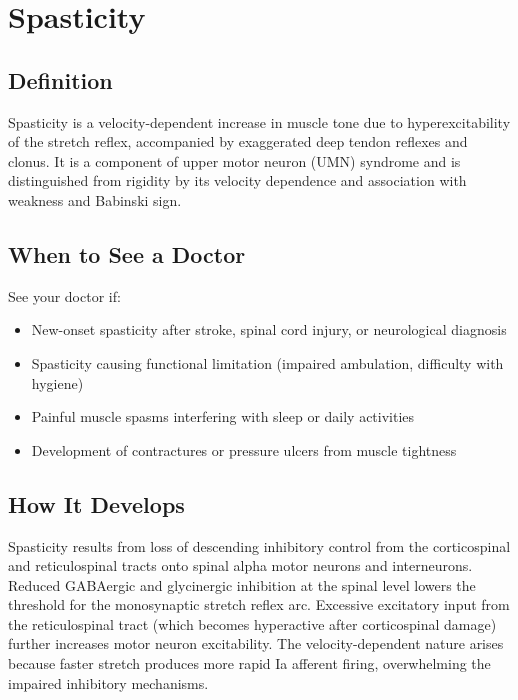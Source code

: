 \chapter{Spasticity}

\section*{Definition}
Spasticity is a velocity-dependent increase in muscle tone due to hyperexcitability of the stretch reflex, accompanied by exaggerated deep tendon reflexes and clonus. It is a component of upper motor neuron (UMN) syndrome and is distinguished from rigidity by its velocity dependence and association with weakness and Babinski sign.

\section*{When to See a Doctor}
See your doctor if:
\begin{itemize}
  \item New-onset spasticity after stroke, spinal cord injury, or neurological diagnosis
  \item Spasticity causing functional limitation (impaired ambulation, difficulty with hygiene)
  \item Painful muscle spasms interfering with sleep or daily activities
  \item Development of contractures or pressure ulcers from muscle tightness
\end{itemize}

\section*{How It Develops}
Spasticity results from loss of descending inhibitory control from the corticospinal and reticulospinal tracts onto spinal alpha motor neurons and interneurons. Reduced GABAergic and glycinergic inhibition at the spinal level lowers the threshold for the monosynaptic stretch reflex arc. Excessive excitatory input from the reticulospinal tract (which becomes hyperactive after corticospinal damage) further increases motor neuron excitability. The velocity-dependent nature arises because faster stretch produces more rapid Ia afferent firing, overwhelming the impaired inhibitory mechanisms.

